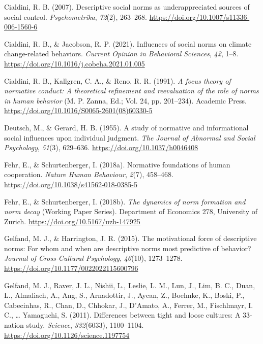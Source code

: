\documentclass[
  english,
  man,floatsintext]{apa6}
\newlength{\cslhangindent}
\newlength{\cslentryspacingunit} %
\newenvironment{CSLReferences}[2] %
 {%
  \setlength{\parindent}{0pt}
  \ifodd #1
  \let\oldpar\par
  \def\par{\hangindent=\cslhangindent\oldpar}
  \fi
  \setlength{\parskip}{#2\cslentryspacingunit}
 }%
 {}
\begin{document}
\begin{CSLReferences}{1}{0}
\leavevmode{}%
Cialdini, R. B. (2007). Descriptive social norms as underappreciated sources of social control. \emph{Psychometrika}, \emph{72}(2), 263--268. \url{https://doi.org/10.1007/s11336-006-1560-6}

\leavevmode{}%
Cialdini, R. B., \& Jacobson, R. P. (2021). Influences of social norms on climate change-related behaviors. \emph{Current Opinion in Behavioral Sciences}, \emph{42}, 1--8. \url{https://doi.org/10.1016/j.cobeha.2021.01.005}

\leavevmode{}%
Cialdini, R. B., Kallgren, C. A., \& Reno, R. R. (1991). \emph{A focus theory of normative conduct: A theoretical refinement and reevaluation of the role of norms in human behavior} (M. P. Zanna, Ed.; Vol. 24, pp. 201--234). Academic Press. \url{https://doi.org/10.1016/S0065-2601(08)60330-5}

\leavevmode{}%
Deutsch, M., \& Gerard, H. B. (1955). A study of normative and informational social influences upon individual judgment. \emph{The Journal of Abnormal and Social Psychology}, \emph{51}(3), 629--636. \url{https://doi.org/10.1037/h0046408}

\leavevmode{}%
Fehr, E., \& Schurtenberger, I. (2018a). Normative foundations of human cooperation. \emph{Nature Human Behaviour}, \emph{2}(7), 458--468. \url{https://doi.org/10.1038/s41562-018-0385-5}

\leavevmode{}%
Fehr, E., \& Schurtenberger, I. (2018b). \emph{The dynamics of norm formation and norm decay} (Working Paper Series). Department of Economics 278, University of Zurich. \url{https://doi.org/10.5167/uzh-147925}

\leavevmode{}%
Gelfand, M. J., \& Harrington, J. R. (2015). The motivational force of descriptive norms: For whom and when are descriptive norms most predictive of behavior? \emph{Journal of Cross-Cultural Psychology}, \emph{46}(10), 1273--1278. \url{https://doi.org/10.1177/0022022115600796}

\leavevmode{}%
Gelfand, M. J., Raver, J. L., Nishii, L., Leslie, L. M., Lun, J., Lim, B. C., Duan, L., Almaliach, A., Ang, S., Arnadottir, J., Aycan, Z., Boehnke, K., Boski, P., Cabecinhas, R., Chan, D., Chhokar, J., D'Amato, A., Ferrer, M., Fischlmayr, I. C., \ldots{} Yamaguchi, S. (2011). Differences between tight and loose cultures: A 33-nation study. \emph{Science}, \emph{332}(6033), 1100--1104. \url{https://doi.org/10.1126/science.1197754}


\end{CSLReferences}
\end{document}
